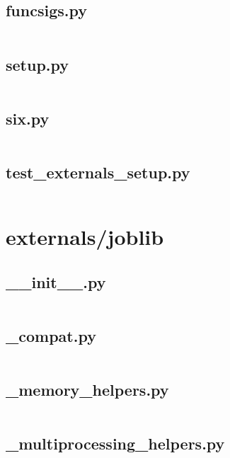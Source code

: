 \documentclass{article}
\begin{document}
\subsection{funcsigs.py}
\inputminted{python}{/home/dufferzafar/dev/@clones/scikit-learn/sklearn/externals/funcsigs.py}
\newpage

\subsection{setup.py}
\inputminted{python}{/home/dufferzafar/dev/@clones/scikit-learn/sklearn/externals/setup.py}
\newpage

\subsection{six.py}
\inputminted{python}{/home/dufferzafar/dev/@clones/scikit-learn/sklearn/externals/six.py}
\newpage

\subsection{test\_externals\_setup.py}
\inputminted{python}{/home/dufferzafar/dev/@clones/scikit-learn/sklearn/externals/test_externals_setup.py}
\newpage

\section{externals/joblib}

\subsection{\_\_init\_\_.py}
\inputminted{python}{/home/dufferzafar/dev/@clones/scikit-learn/sklearn/externals/joblib/__init__.py}
\newpage

\subsection{\_compat.py}
\inputminted{python}{/home/dufferzafar/dev/@clones/scikit-learn/sklearn/externals/joblib/_compat.py}
\newpage

\subsection{\_memory\_helpers.py}
\inputminted{python}{/home/dufferzafar/dev/@clones/scikit-learn/sklearn/externals/joblib/_memory_helpers.py}
\newpage

\subsection{\_multiprocessing\_helpers.py}
\inputminted{python}{/home/dufferzafar/dev/@clones/scikit-learn/sklearn/externals/joblib/_multiprocessing_helpers.py}
\newpage
\end{document}
